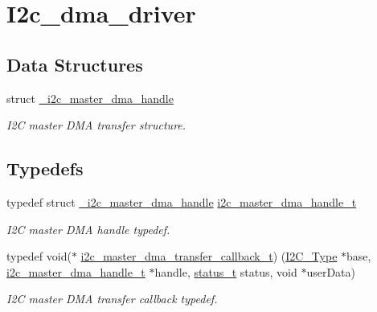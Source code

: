 \hypertarget{group__i2c__dma__driver}{}\section{I2c\+\_\+dma\+\_\+driver}
\label{group__i2c__dma__driver}
\subsection*{Data Structures}
\begin{DoxyCompactItemize}
\item 
struct \mbox{\hyperlink{struct__i2c__master__dma__handle}{\+\_\+i2c\+\_\+master\+\_\+dma\+\_\+handle}}
\begin{DoxyCompactList}\small\item\em I2C master D\+MA transfer structure. \end{DoxyCompactList}\end{DoxyCompactItemize}
\subsection*{Typedefs}
\begin{DoxyCompactItemize}
\item 
\mbox{\label{group__i2c__dma__driver_gab13fb9488effeb728350d3bf8d6c784a}} 
typedef struct \mbox{\hyperlink{struct__i2c__master__dma__handle}{\+\_\+i2c\+\_\+master\+\_\+dma\+\_\+handle}} \mbox{\hyperlink{group__i2c__dma__driver_gab13fb9488effeb728350d3bf8d6c784a}{i2c\+\_\+master\+\_\+dma\+\_\+handle\+\_\+t}}
\begin{DoxyCompactList}\small\item\em I2C master D\+MA handle typedef. \end{DoxyCompactList}\item 
\mbox{\label{group__i2c__dma__driver_gaa04081e50be4d84531d2653c2db6c0f9}} 
typedef void($\ast$ \mbox{\hyperlink{group__i2c__dma__driver_gaa04081e50be4d84531d2653c2db6c0f9}{i2c\+\_\+master\+\_\+dma\+\_\+transfer\+\_\+callback\+\_\+t}}) (\mbox{\hyperlink{struct_i2_c___type}{I2\+C\+\_\+\+Type}} $\ast$base, \mbox{\hyperlink{group__i2c__dma__driver_gab13fb9488effeb728350d3bf8d6c784a}{i2c\+\_\+master\+\_\+dma\+\_\+handle\+\_\+t}} $\ast$handle, \mbox{\hyperlink{group__ksdk__common_gaaabdaf7ee58ca7269bd4bf24efcde092}{status\+\_\+t}} status, void $\ast$user\+Data)
\begin{DoxyCompactList}\small\item\em I2C master D\+MA transfer callback typedef. \end{DoxyCompactList}\end{DoxyCompactItemize}
